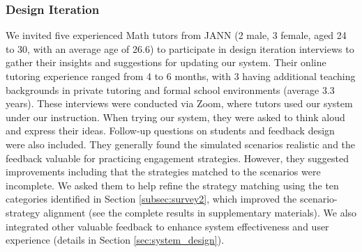 
\subsubsection{Design Iteration}
\label{subsec:iteration}
We invited five experienced Math tutors from JANN (2 male, 3 female, aged 24 to 30, with an average age of 26.6) to participate in design iteration interviews to gather their insights and suggestions for updating our system. Their online tutoring experience ranged from 4 to 6 months, with 3 having additional teaching backgrounds in private tutoring and formal school environments (average 3.3 years).  These interviews were conducted via Zoom, where tutors used our system under our instruction. When trying our system, they were asked to think aloud and express their ideas. Follow-up questions on students and feedback design were also included. They generally found the simulated scenarios realistic and the feedback valuable for practicing engagement strategies. However, they suggested improvements including that the strategies matched to the scenarios were incomplete. We asked them to help refine the strategy matching using the ten categories identified in Section \ref{subsec:survey2}, which improved the scenario-strategy alignment (see the complete results in supplementary materials). We also integrated other valuable feedback to enhance system effectiveness and user experience (details in Section \ref{sec:system_design}).

